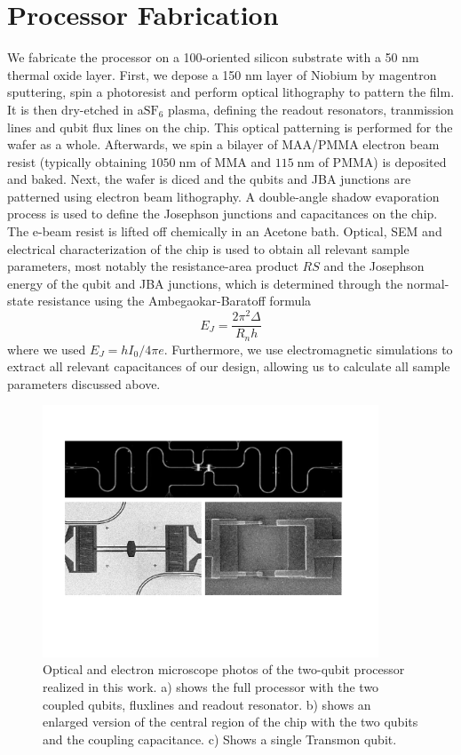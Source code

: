 \section{Processor Fabrication}

We fabricate the processor on a 100-oriented silicon substrate with a 50 nm thermal oxide layer. First, we depose a 150 nm layer of Niobium by magentron sputtering, spin a photoresist and perform optical lithography to pattern the film. It is then dry-etched in a$\mathrm{SF}_6$ plasma, defining the readout resonators, tranmission lines and qubit flux lines on the chip. This optical patterning is performed for the wafer as a whole. Afterwards, we spin a bilayer of MAA/PMMA electron beam resist (typically obtaining $1050\;\mathrm{nm}$ of MMA and $115\;\mathrm{nm}$ of PMMA) is deposited and baked. Next, the wafer is diced and the qubits and JBA junctions are patterned using electron beam lithography. A double-angle shadow evaporation process is used to define the Josephson junctions and capacitances on the chip. The e-beam resist is lifted off chemically in an Acetone bath. Optical, SEM and electrical characterization of the chip is used to obtain all relevant sample parameters, most notably the resistance-area product $RS$ and the Josephson energy of the qubit and JBA junctions, which is determined through the normal-state resistance using the Ambegaokar-Baratoff formula
%
\begin{equation}
E_J = \frac{2\pi^2 \Delta}{R_n h}
\end{equation}
%
where we used $E_J = h I_0 / 4\pi e$. Furthermore, we use electromagnetic simulations to extract all relevant capacitances of our design, allowing us to calculate all sample parameters discussed above.

\begin{figure}
	\includegraphics[width=10cm]{"./material/figures/2-qubit-processor/processor photos"}
	\caption{Optical and electron microscope photos of the two-qubit processor realized in this work. a) shows the full processor with the two coupled qubits, fluxlines and readout resonator. b) shows an enlarged version of the central region of the chip with the two qubits and the coupling capacitance. c) Shows a single Transmon qubit.}
	\label{fig:setup_wiring}
\end{figure}


